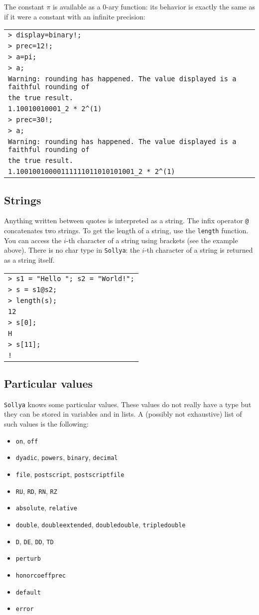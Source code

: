\documentclass[a4paper]{article}
\newcommand{\com}[1]{\texttt{#1}}
\newcommand{\sollya}{\texttt{Sollya}\xspace}
\newcommand{\code}[1]{
\begin{center}
\begin{tabular}{|p{14.8cm}|}
\hline
#1
\hline
\end{tabular}
\end{center}
}
\newcommand{\ligne}[1]{\texttt{#1}\\}
\begin{document}
The constant $\pi$ is available as a $0$-ary function: its behavior is exactly the same as if it were a constant with an infinite precision:

\code{
\ligne{> display=binary!;}
\ligne{> prec=12!;}
\ligne{> a=pi;}
\ligne{> a;}
\ligne{Warning: rounding has happened. The value displayed is a faithful rounding of}
\ligne{the true result.}
\ligne{1.10010010001\_2 * 2\^{}(1)}
\ligne{> prec=30!;}
\ligne{> a;}
\ligne{Warning: rounding has happened. The value displayed is a faithful rounding of}
\ligne{the true result.}
\ligne{1.10010010000111111011010101001\_2 * 2\^{}(1)}
}


\subsection{Strings}
Anything written between quotes is interpreted as a string. The infix operator \com{@} concatenates two strings. To get the length of a string, use the \com{length} function. You can access the $i$-th character of a string using brackets (see the example above). There is no char type in \sollya: the $i$-th character of a string is returned as a string itself.

\code{
\ligne{> s1 = "Hello "; s2 = "World!";}
\ligne{> s = s1@s2;}
\ligne{> length(s);}
\ligne{12}
\ligne{> s[0];}
\ligne{H}
\ligne{> s[11];}
\ligne{!}
}

\subsection{Particular values}
\sollya knows some particular values. These values do not really have a type but they can be stored in variables and in lists. A (possibly not exhaustive) list of such values is the following:

\begin{itemize}
\item \com{on}, \com{off}
\item \com{dyadic}, \com{powers}, \com{binary}, \com{decimal}
\item \com{file}, \com{postscript}, \com{postscriptfile}
\item \com{RU}, \com{RD}, \com{RN}, \com{RZ}
\item \com{absolute}, \com{relative}
\item \com{double}, \com{doubleextended}, \com{doubledouble}, \com{tripledouble}
\item \com{D}, \com{DE}, \com{DD}, \com{TD}
\item \com{perturb}
\item \com{honorcoeffprec}
\item \com{default}
\item \com{error}
\end{itemize}
\end{document}

